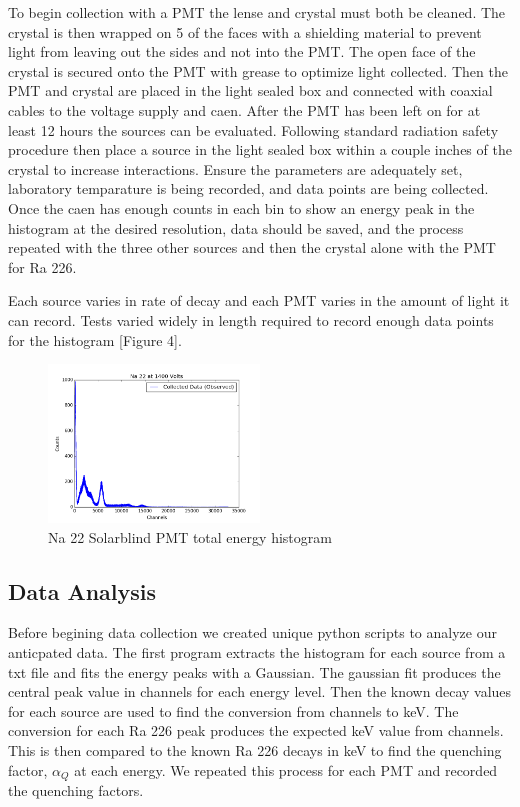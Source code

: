 \documentclass{article}
\begin{document}
To begin collection with a PMT the lense and crystal must both be cleaned. The crystal is then wrapped on 5 of the faces with a shielding material to prevent light from leaving out the sides and not into the PMT. The open face of the crystal is secured onto the PMT with grease to optimize light collected. Then the PMT and crystal are placed in the light sealed box and connected with coaxial cables to the voltage supply and caen. After the PMT has been left on for at least 12 hours the sources can be evaluated. Following standard radiation safety procedure then place a source in the light sealed box within a couple inches of the crystal to increase interactions. Ensure the parameters are adequately set, laboratory temparature is being recorded, and data points are being collected. Once the caen has enough counts in each bin to show an energy peak in the histogram at the desired resolution, data should be saved, and the process repeated with the three other sources and then the crystal alone with the PMT for Ra 226. 

Each source varies in rate of decay and each PMT varies in the amount of light it can record. Tests varied widely in length required to record enough data points for the histogram [Figure 4]. 

\begin{figure}
  \centering
    \includegraphics[width=0.5\textwidth]{na.png}
  \caption{Na 22 Solarblind PMT total energy histogram}
  \label{fig:workflowedge}
\end{figure} 


\subsection{Data Analysis}

Before begining data collection we created unique python scripts to analyze our anticpated data. The first program extracts the histogram for each source from a txt file and fits the energy peaks with a Gaussian. The gaussian fit produces the central peak value in channels for each energy level. Then the known decay values for each source are used to find the conversion from channels to keV. The conversion for each Ra 226 peak produces the expected keV value from channels. This is then compared to the known Ra 226 decays in keV to find the quenching factor, $\alpha_Q$ at each energy. We repeated this process for each PMT and recorded the quenching factors. 
\end{document}
